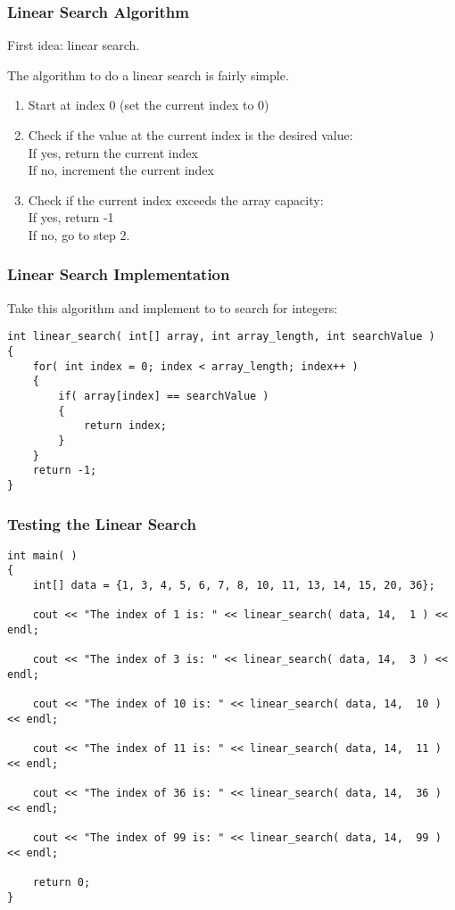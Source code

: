 \begin{frame}
\frametitle{Linear Search Algorithm}

First idea: linear search.

The algorithm to do a linear search is fairly simple.

\begin{enumerate}
\item Start at index 0 (set the current index to 0)
\item Check if the value at the current index is the desired value:\\
	\quad If yes, return the current index\\
	\quad If no, increment the current index
\item Check if the current index exceeds the array capacity:\\
	\quad If yes, return -1\\
	\quad If no, go to step 2.
\end{enumerate}

\end{frame}

\begin{frame}[fragile]
\frametitle{Linear Search Implementation}

Take this algorithm and implement to to search for integers:

{\scriptsize
\begin{verbatim}
int linear_search( int[] array, int array_length, int searchValue )
{
    for( int index = 0; index < array_length; index++ )
    {
        if( array[index] == searchValue )
        {
            return index;
        }
    }
    return -1;
}
\end{verbatim}
}
\end{frame}

\begin{frame}[fragile]
\frametitle{Testing the Linear Search}

{\scriptsize
\begin{verbatim}
int main( )
{
    int[] data = {1, 3, 4, 5, 6, 7, 8, 10, 11, 13, 14, 15, 20, 36};

    cout << "The index of 1 is: " << linear_search( data, 14,  1 ) << endl;
    
    cout << "The index of 3 is: " << linear_search( data, 14,  3 ) << endl;
    
    cout << "The index of 10 is: " << linear_search( data, 14,  10 ) << endl;
    
    cout << "The index of 11 is: " << linear_search( data, 14,  11 ) << endl;
    
    cout << "The index of 36 is: " << linear_search( data, 14,  36 ) << endl;
    
    cout << "The index of 99 is: " << linear_search( data, 14,  99 ) << endl;
    
    return 0;
}
\end{verbatim}
}

\end{frame}

